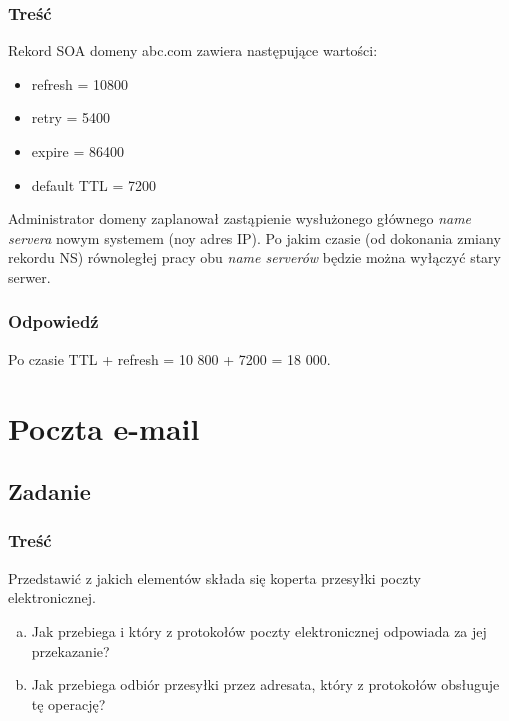 		\subsubsection{Treść}
			Rekord SOA domeny abc.com zawiera następujące wartości:
			\begin{itemize}
				\item refresh = 10800
				\item retry = 5400
				\item expire = 86400
				\item default TTL = 7200
			\end{itemize}
			Administrator domeny zaplanował zastąpienie wysłużonego głównego \emph{name servera} nowym systemem (noy adres IP). Po jakim czasie (od dokonania zmiany rekordu NS) równoległej pracy obu \emph{name serverów} będzie można wyłączyć stary serwer.
		\subsubsection{Odpowiedź}	
			Po czasie TTL + refresh = 10 800 + 7200 = 18 000.
			
\newpage
\section{Poczta e-mail}
	\subsection{Zadanie}
		\subsubsection{Treść}
			Przedstawić z jakich elementów składa się koperta przesyłki poczty elektronicznej.
			\begin{enumerate}[a)]
				\item Jak przebiega i który z protokołów poczty elektronicznej odpowiada za jej przekazanie?
				\item Jak przebiega odbiór przesyłki przez adresata, który z protokołów obsługuje tę operację?
			\end{enumerate}
